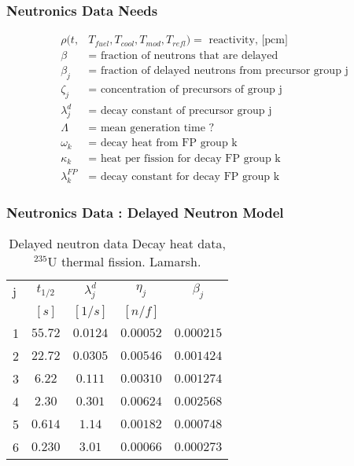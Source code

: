 \begin{frame}[fragile]
  \frametitle{Neutronics Data Needs}
\footnotesize{
  \begin{align}
    \rho(t,&T_{fuel},T_{cool},T_{mod}, T_{refl}) = \mbox{ reactivity, [pcm]}\\
    \beta &= \mbox{ fraction of neutrons that are delayed}\\ 
    \beta_j &= \mbox{ fraction of delayed neutrons from precursor group j}\\  
    \zeta_j &= \mbox{ concentration of precursors of group j}\\ 
    \lambda^{d}_j &= \mbox{ decay constant of precursor group j}\\ 
    \Lambda &= \mbox{ mean generation time ? }\\
    \omega_k &= \mbox{ decay heat from FP group k}\\ 
    \kappa_k &= \mbox{ heat per fission for decay FP group k}\\ 
    \lambda^{FP}_k &= \mbox{ decay constant for decay FP group k} 
  \end{align}
}

\end{frame}
\begin{frame}[fragile]
  \frametitle{Neutronics Data : Delayed Neutron Model}

    \begin{table}
      \begin{tabular}{|l|c|c|c|c|}
        \hline
        j & $t_{1/2}$ & $\lambda^d_j$  & $\eta_j$ & $\beta_j$\\
          &   $[s]$   &    $[1/s]$     & $[n/f]$  & \\
        \hline
        1   &  $ 55.72 $  &  $ 0.0124 $  &  $ 0.00052 $  &  $ 0.000215$  \\
        2   &  $ 22.72 $  &  $ 0.0305 $  &  $ 0.00546 $  &  $ 0.001424$  \\
        3   &  $ 6.22  $  &  $ 0.111  $  &  $ 0.00310 $  &  $ 0.001274$  \\
        4   &  $ 2.30  $  &  $ 0.301  $  &  $ 0.00624 $  &  $ 0.002568$  \\
        5   &  $ 0.614 $  &  $ 1.14   $  &  $ 0.00182 $  &  $ 0.000748$  \\
        6   &  $ 0.230 $  &  $ 3.01   $  &  $ 0.00066 $  &  $ 0.000273$  \\
        \hline
      \end{tabular}
      \caption{Delayed neutron data Decay heat data, $^{235}$U thermal fission. 
    Lamarsh.}
      \label{tab:delayedneutrons}
    \end{table}

\end{frame}

